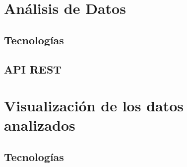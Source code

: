 \section[Análisis de Datos]{Análisis de Datos}

\subsection{Tecnologías}

\subsection{API REST}

\subsection{}

\section[Visualización de los datos analizados]{Visualización de los datos analizados}

\subsection{Tecnologías}

